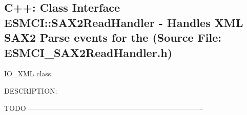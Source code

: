  
\setlength{\oldparskip}{\parskip}
\setlength{\parskip}{1.5ex}
\setlength{\oldparindent}{\parindent}
\setlength{\parindent}{0pt}
\setlength{\oldbaselineskip}{\baselineskip}
\setlength{\baselineskip}{11pt}
 
\def\bv{\begin{verbatim}}
\def\ev{\end{verbatim}}
\def\be{\begin{equation}}
\def\ee{\end{equation}}
\def\bea{\begin{eqnarray}}
\def\eea{\end{eqnarray}}
\def\bi{\begin{itemize}}
\def\ei{\end{itemize}}
\def\bn{\begin{enumerate}}
\def\en{\end{enumerate}}
\def\bd{\begin{description}}
\def\ed{\end{description}}
\def\({\left (}
\def\){\right )}
\def\[{\left [}
\def\]{\right ]}
\def\<{\left  \langle}
\def\>{\right \rangle}
\def\cI{{\cal I}}
\def\diag{\mathop{\rm diag}}
\def\tr{\mathop{\rm tr}}


 
\subsection{C++:  Class Interface ESMCI::SAX2ReadHandler - Handles XML SAX2 Parse events for the (Source File: ESMCI\_SAX2ReadHandler.h)}


   IO_XML class.
  
{\sf DESCRIPTION:\\ }


    TODO
  -------------------------------------------------------------------------
  
